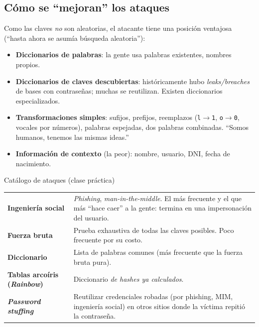 \documentclass[11pt,a4paper]{article}
\begin{document}
\subsection{Cómo se ``mejoran'' los ataques}
Como las claves \emph{no} son aleatorias, el atacante tiene una posición ventajosa
(``hasta ahora se asumía búsqueda aleatoria''):
\begin{itemize}[leftmargin=1.4em,itemsep=1pt]
  \item \textbf{Diccionarios de palabras}: la gente usa palabras existentes, nombres propios.
  \item \textbf{Diccionarios de claves descubiertas}: históricamente hubo \emph{leaks/breaches}
        de bases con contraseñas; muchas se reutilizan. Existen diccionarios especializados.
  \item \textbf{Transformaciones simples}: sufijos, prefijos, reemplazos
        (\texttt{l}$\to$\texttt{1}, \texttt{o}$\to$\texttt{0}, vocales por números), palabras
        espejadas, dos palabras combinadas. ``Somos humanos, tenemos las mismas ideas.''
  \item \textbf{Información de contexto} (la peor): nombre, usuario, DNI, fecha de nacimiento.
\end{itemize}

\begin{practbox}{Catálogo de ataques (clase práctica)}
\begin{center}
\renewcommand{\arraystretch}{1.25}
\begin{tabular}{>{\bfseries}p{3.6cm} p{9.0cm}}
\toprule
Ingeniería social & \emph{Phishing}, \emph{man-in-the-middle}. El más frecuente y el que más
``hace caer'' a la gente: termina en una impersonación del usuario.\\
Fuerza bruta & Prueba exhaustiva de todas las claves posibles. Poco frecuente por su costo.\\
Diccionario & Lista de palabras comunes (más frecuente que la fuerza bruta pura).\\
Tablas arcoíris (\emph{Rainbow}) & Diccionario \emph{de hashes ya calculados}.\\
\emph{Password stuffing} & Reutilizar credenciales robadas (por phishing, MIM, ingeniería
social) en otros sitios donde la víctima repitió la contraseña.\\
\bottomrule
\end{tabular}
\end{center}
\end{practbox}
\end{document}
